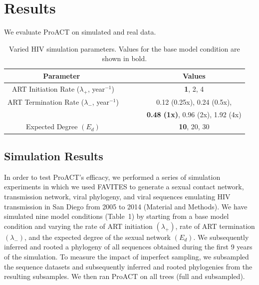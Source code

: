 \documentclass[oupdraft]{sysbio}
\begin{document}
\section{Results}
We evaluate ProACT on simulated and real data. 

\begin{table}[!t]
\begin{center}
\begin{tabular}{c c}
\toprule
\textbf{Parameter~~~~~~} & \textbf{Values}\\
\toprule
ART Initiation Rate ($\lambda_+$, year$^{-1}$)~~~~~~ & \textbf{1}, 2, 4\\
\hdashline
ART Termination Rate ($\lambda_-$, year$^{-1}$)~~~~~~ & 0.12 (0.25x), 0.24 (0.5x),\\
~~~~~~ & \textbf{0.48 (1x)}, 0.96 (2x), 1.92 (4x)\\
\hdashline
Expected Degree $\left(E_d\right)$~~~~~~ & \textbf{10}, 20, 30\\
\bottomrule
\end{tabular}
\end{center}
\caption{Varied HIV simulation parameters. Values for the base model condition are shown in bold.}
\label{tab:favites}
\end{table}

\subsection{Simulation Results}

In order to test ProACT's efficacy, we performed a series of simulation experiments in which we used FAVITES \citep{Moshiri2018} to generate a sexual contact network, transmission network, viral phylogeny, and viral sequences emulating HIV transmission in San Diego from 2005 to 2014 (Material and Methods).
We have simulated nine model conditions (Table~1) by starting from a base model condition and varying the rate of ART initiation $(\lambda_+)$, rate of ART termination $(\lambda_-)$, and the expected degree of the sexual network $(E_d)$.
We subsequently inferred and rooted a phylogeny of all sequences obtained during the first 9 years of the simulation.
To measure the impact of imperfect sampling, we subsampled the sequence datasets and subsequently inferred and rooted phylogenies from the resulting subsamples.
We then ran ProACT on all trees (full and subsampled).
\end{document}
